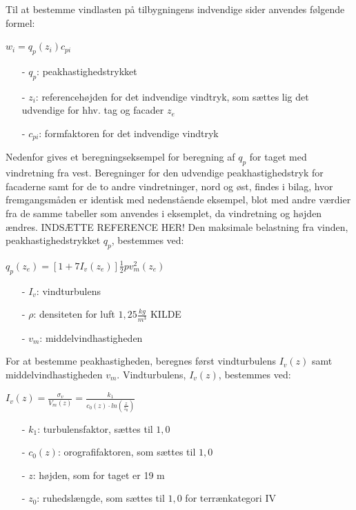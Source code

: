 Til at bestemme vindlasten på tilbygningens indvendige sider anvendes følgende formel:
\begin{center} 
	$w_i=q_p(z_i)c_{pi}$
\end{center}
\begin{itemize}
	\item[-] $q_p$: peakhastighedstrykket
	\item[-] $z_i$: referencehøjden for det indvendige vindtryk, som sættes lig det udvendige for hhv. tag og facader $z_e$ \citep[ kapitel 7.2.9]{EU91}
	\item[-] $c_{pi}$: formfaktoren for det indvendige vindtryk
\end{itemize}

Nedenfor gives et beregningseksempel for beregning af $q_p$ for taget med vindretning fra vest. Beregninger for den udvendige peakhastighedstryk for facaderne samt for de to andre vindretninger, nord og øst, findes i bilag, hvor fremgangsmåden er identisk med nedenstående eksempel, blot med andre værdier fra de samme tabeller som anvendes i eksemplet, da vindretning og højden ændres. INDSÆTTE REFERENCE HER!
\newline
\newline
Den maksimale belastning fra vinden, peakhastighedstrykket $q_p$, bestemmes ved:
\begin{center}
$q_p(z_e)=[1+7I_v(z_e)]\frac{1}{2}pv_m^2(z_e)$
\end{center}
\begin{itemize}
	\item[-] $I_v$: vindturbulens
	\item[-] $\rho$: densiteten for luft $1,\!25 \frac{kg}{m^3}$ KILDE
	\item[-] $v_m$: middelvindhastigheden
\end{itemize}
For at bestemme peakhastigheden, beregnes først vindturbulens $I_v(z)$ samt middelvindhastigheden $v_m$.
\newline
\newline
Vindturbulens, $I_v(z)$, bestemmes ved:
\begin{center}
$I_v(z)=\frac{\sigma_v}{V_m(z)}=\frac{k_1}{c_0(z)\cdot ln(\frac{z}{z_0})}$
\end{center}
\begin{itemize}
	\item[-] $k_1$: turbulensfaktor, sættes til $1,\!0$ \citep[ kapitel 4.4]{EU91}
	\item[-] $c_0(z)$: orografifaktoren, som sættes til $1,\!0$ \citep[ kapitel 4.3.1]{EU91}
	\item[-] $z$: højden, som for taget er 19 m
	\item[-] $z_0$: ruhedslængde, som sættes til $1,\!0$ for terrænkategori IV \citep[ tabel 4.1 kapitel 4.3.2]{EU91}
\end{itemize}
